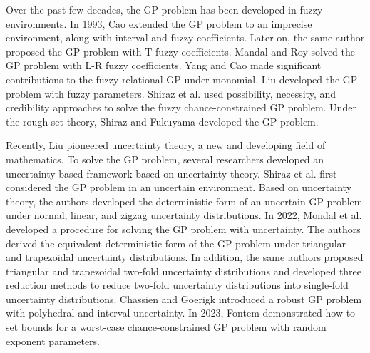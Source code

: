 \par Over the past few decades, the GP problem has been developed in fuzzy environments. In 1993, Cao \cite{Cao 1993} extended the GP problem to an imprecise environment, along with interval and fuzzy coefficients. Later on, the same author \cite{Cao 1997} proposed the GP problem with T-fuzzy coefficients. Mandal and Roy \cite{Mandal 2006} solved the GP problem with L-R fuzzy coefficients. Yang and Cao \cite{Yang 2007} made significant contributions to the fuzzy relational GP under monomial. Liu \cite{Liu 2007} developed the GP problem with fuzzy parameters. Shiraz et al. \cite{Shiraz 2017} used possibility, necessity, and credibility approaches to solve the fuzzy chance-constrained GP problem. Under the rough-set theory, Shiraz and Fukuyama \cite{Shiraz 2018} developed the GP problem.
\par Recently, Liu \cite{Liu 2015} pioneered uncertainty theory, a new and developing field of mathematics. To solve the GP problem, several researchers developed an uncertainty-based framework based on uncertainty theory. Shiraz et al. \cite{Shiraz 2016} first considered the GP problem in an uncertain environment. Based on uncertainty theory, the authors developed the deterministic form of an uncertain GP problem under normal, linear, and zigzag uncertainty distributions. In 2022, Mondal et al. \cite{Mondal 2022} developed a procedure for solving the GP problem with uncertainty. The authors derived the equivalent deterministic form of the GP problem under triangular and trapezoidal uncertainty distributions. In addition, the same authors \cite{Mondal 2023} proposed triangular and trapezoidal two-fold uncertainty distributions and developed three reduction methods to reduce two-fold uncertainty distributions into single-fold uncertainty distributions. Chassien and Goerigk \cite{Chassein 2019} introduced a robust GP problem with polyhedral and interval uncertainty. In 2023, Fontem \cite{Fontem 2023} demonstrated how to set bounds for a worst-case chance-constrained GP problem with random exponent parameters.
